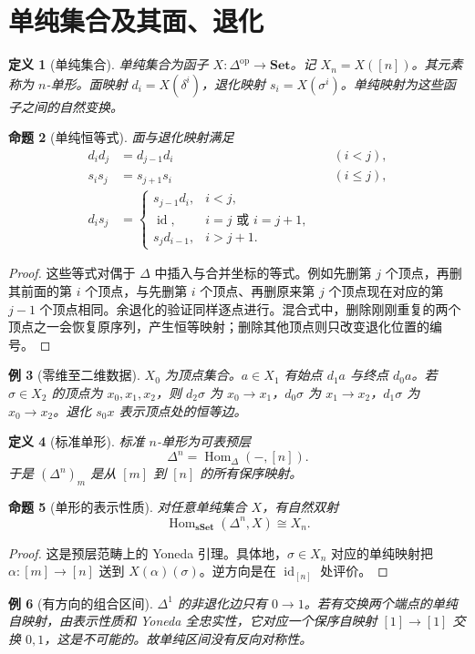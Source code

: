 \documentclass[12pt,oneside,openany,fontset=none]{ctexbook}
\theoremstyle{cn}
\newtheorem{definition}{定义}[chapter]
\newtheorem{example}[definition]{例}
\newtheorem{proposition}[definition]{命题}
\numberwithin{equation}{chapter}
\newcommand{\Set}{\mathbf{Set}}
\newcommand{\sSet}{\mathbf{sSet}}
\newcommand{\id}{\operatorname{id}}
\newcommand{\Hom}{\operatorname{Hom}}
\newcommand{\op}{\mathrm{op}}
\begin{document}
\section{单纯集合及其面、退化}
\begin{definition}[单纯集合]
单纯集合为函子 $X:\Delta^\op\to\Set$。记 $X_n=X([n])$。其元素称为 $n$-单形。面映射 $d_i=X(\delta^i)$，退化映射 $s_i=X(\sigma^i)$。单纯映射为这些函子之间的自然变换。
\end{definition}
\begin{proposition}[单纯恒等式]
面与退化映射满足
\begin{align*}
d_i d_j&=d_{j-1}d_i &&(i<j),\\
s_i s_j&=s_{j+1}s_i &&(i\le j),\\
d_i s_j&=
\begin{cases}
s_{j-1}d_i,&i<j,\\
\id,&i=j\text{ 或 }i=j+1,\\
s_jd_{i-1},&i>j+1.
\end{cases}
\end{align*}
\end{proposition}
\begin{proof}
这些等式对偶于 $\Delta$ 中插入与合并坐标的等式。例如先删第 $j$ 个顶点，再删其前面的第 $i$ 个顶点，与先删第 $i$ 个顶点、再删原来第 $j$ 个顶点现在对应的第 $j-1$ 个顶点相同。余退化的验证同样逐点进行。混合式中，删除刚刚重复的两个顶点之一会恢复原序列，产生恒等映射；删除其他顶点则只改变退化位置的编号。
\end{proof}
\begin{example}[零维至二维数据]
$X_0$ 为顶点集合。$a\in X_1$ 有始点 $d_1a$ 与终点 $d_0a$。若 $\sigma\in X_2$ 的顶点为 $x_0,x_1,x_2$，则 $d_2\sigma$ 为 $x_0\to x_1$，$d_0\sigma$ 为 $x_1\to x_2$，$d_1\sigma$ 为 $x_0\to x_2$。退化 $s_0x$ 表示顶点处的恒等边。
\end{example}
\begin{definition}[标准单形]
标准 $n$-单形为可表预层
\[
\Delta^n=\Hom_\Delta(-,[n]).
\]
于是 $(\Delta^n)_m$ 是从 $[m]$ 到 $[n]$ 的所有保序映射。
\end{definition}
\begin{proposition}[单形的表示性质]
对任意单纯集合 $X$，有自然双射
\[
\Hom_{\sSet}(\Delta^n,X)\cong X_n.
\]
\end{proposition}
\begin{proof}
这是预层范畴上的 Yoneda 引理。具体地，$\sigma\in X_n$ 对应的单纯映射把 $\alpha:[m]\to[n]$ 送到 $X(\alpha)(\sigma)$。逆方向是在 $\id_{[n]}$ 处评价。
\end{proof}
\begin{example}[有方向的组合区间]
$\Delta^1$ 的非退化边只有 $0\to1$。若有交换两个端点的单纯自映射，由表示性质和 Yoneda 全忠实性，它对应一个保序自映射 $[1]\to[1]$ 交换 $0,1$，这是不可能的。故单纯区间没有反向对称性。
\end{example}
\end{document}
